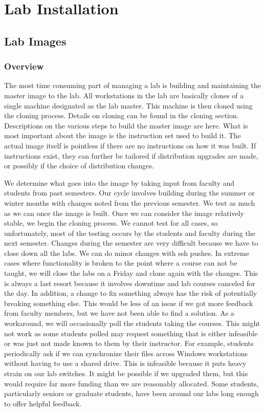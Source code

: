 \chapter{Lab Installation} \label{ch:lab-install}
\section{Lab Images} \label{sec:lab-images}
\subsection{Overview}
The most time consuming part of managing a lab is building and maintaining the master image to the lab.  All workstations in the lab are basically clones of a single machine designated as the lab master.  This machine is then cloned using the cloning process.  Details on cloning can be found in the cloning section.  Descriptions on the various steps to build the master image are here.  What is most important about the image is the instruction set used to build it.  The actual image itself is pointless if there are no instructions on how it was built.  If instructions exist, they can further be tailored if distribution upgrades are made, or possibly if the choice of distribution changes.  

We determine what goes into the image by taking input from faculty and students from past semesters. Our cycle involves building during the summer or winter months with changes noted from the previous semester. We test as much as we can once the image is built. Once we can consider the image relatively stable, we begin the cloning process. We cannot test for all cases, so unfortunately, most of the testing occurs by the students and faculty during the next semester. Changes during the semester are very difficult because we have to close down all the labs. We can do minor changes with ssh pushes. In extreme cases where functionality is broken to the point where a course can not be taught, we will close the labs on a Friday and clone again with the changes. This is always a last resort because it involves downtime and lab courses canceled for the day. In addition, a change to fix something always has the risk of potentially breaking something else.  
This would be less of an issue if we got more feedback from faculty members, but we have not been able to find a solution.  As a workaround, we will occasionally poll the students taking the courses.  This might not work as some students polled may request something that is either infeasible or was just not made known to them by their instructor.  For example, students periodically ask if we can synchronize their files across Windows workstations without having to use a shared drive.  This is infeasible because it puts heavy strain on our lab switches.  It might be possible if we upgraded them, but this would require far more funding than we are reasonably allocated.  Some students, particularly seniors or graduate students, have been around our labs long enough to offer helpful feedback.

